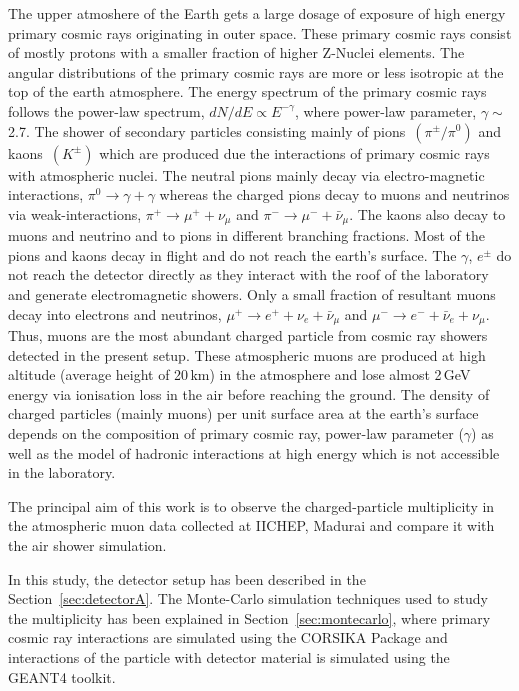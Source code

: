 The upper atmoshere of the Earth gets a large dosage of exposure of
high energy primary cosmic rays originating in outer space. These
primary cosmic rays consist of mostly protons with a smaller fraction
of higher \mbox{Z-Nuclei} elements\cite{cosmic1}. The angular
distributions of the primary cosmic rays are more or less isotropic
at the top of the earth atmosphere. The energy spectrum of the primary
cosmic rays follows the power-law spectrum, $dN/dE \propto E^{-\gamma}$,
where power-law parameter, $\gamma \sim $ 2.7. The shower of secondary
particles consisting mainly of
\mbox{pions $\left(\pi^{\pm}/\pi^0\right)$} and
\mbox{kaons $\left(K^{\pm}\right)$} which are produced due the
interactions of primary cosmic rays with atmospheric nuclei.
The neutral pions mainly decay via electro-magnetic interactions,
$\pi^0 \rightarrow \gamma+\gamma$ whereas the charged pions decay to
muons and neutrinos via weak-interactions,
$\pi^+ \rightarrow \mu^+ + \nu_{\mu}$ and
$\pi^- \rightarrow \mu^- + \bar{\nu}_{\mu}$. The kaons also decay to
muons and neutrino and to pions in different branching fractions.
Most of the pions and kaons decay in flight and do not reach the
earth's surface.
The $\gamma$, $e^{\pm}$ do not reach the detector directly as they
interact with the roof of the laboratory and generate electromagnetic
showers. Only a small fraction of resultant muons decay into
electrons and neutrinos, 
$\mu^+ \rightarrow e^+ + \nu_{e} + \bar{\nu}_{\mu}$ and 
$\mu^- \rightarrow e^- + \bar{\nu}_{e} + \nu_{\mu}$. Thus, muons are the
most abundant charged particle from cosmic ray showers detected in the
present setup. These atmospheric muons are produced at high altitude
(average height of 20\,km) in the atmosphere and lose almost 2\,GeV
energy via ionisation loss in the air before reaching the ground. The 
density of charged particles (mainly muons) per unit surface area at
the earth's surface depends on the composition of primary cosmic ray,
power-law parameter ($\gamma$) as well as the model of hadronic
interactions at high energy which is not accessible in the laboratory.

The principal aim of this work is to observe the charged-particle
multiplicity in the atmospheric muon data collected
at IICHEP, Madurai and compare it with the air shower simulation.

In this study, the detector setup has been described in
the Section~\ref{sec:detectorA}. The Monte-Carlo simulation techniques
used to study the multiplicity has been explained in
Section~\ref{sec:montecarlo}, where primary cosmic ray interactions
are simulated using the CORSIKA Package\cite{corsika763} and
interactions of the particle with detector material is simulated
using the GEANT4 toolkit\cite{geant4}.


